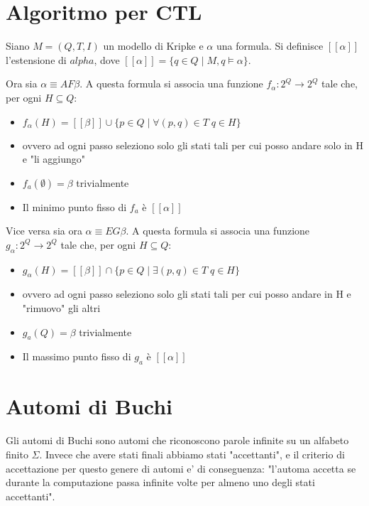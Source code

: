 \section{Algoritmo per CTL}

Siano $M = (Q, T, I)$ un modello di Kripke e $\alpha$ una formula. Si definisce $[[\alpha]]$ l'estensione di $alpha$, dove $[[\alpha]] = \{q \in Q \; | \; M,q \models \alpha\}$.

Ora sia $\alpha \equiv AF\beta$. A questa formula si associa una funzione $f_\alpha : 2^Q \rightarrow 2^Q$ tale che, per ogni $H \subseteq Q$:

\begin{itemize}
  \item $f_\alpha(H) = [[\beta]] \cup \{p \in Q \; | \; \forall (p, q) \in T \; q \in H\}$
  \item ovvero ad ogni passo seleziono solo gli stati tali per cui posso andare solo in H e "li aggiungo"
  \item $f_a(\emptyset) = \beta$ trivialmente
  \item Il minimo punto fisso di $f_a$ \`e $[[\alpha]]$
\end{itemize}

Vice versa sia ora $\alpha \equiv EG\beta$. A questa formula si associa una funzione $g_\alpha : 2^Q \rightarrow 2^Q$ tale che, per ogni $H \subseteq Q$:

\begin{itemize}
  \item $g_\alpha(H) = [[\beta]] \cap \{p \in Q \; | \; \exists (p, q) \in T \; q \in H\}$
  \item ovvero ad ogni passo seleziono solo gli stati tali per cui posso andare in H e "rimuovo" gli altri
  \item $g_a(Q) = \beta$ trivialmente
  \item Il massimo punto fisso di $g_a$ \`e $[[\alpha]]$
\end{itemize}


\section{Automi di Buchi}

Gli automi di Buchi sono automi che riconoscono parole infinite su un alfabeto finito $\Sigma$.
Invece che avere stati finali abbiamo stati "accettanti", e il criterio di accettazione per questo genere di automi e' di conseguenza: "l'automa accetta se durante la computazione passa infinite volte per almeno uno degli stati accettanti".

